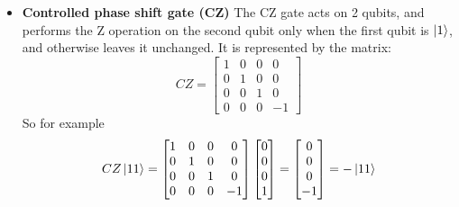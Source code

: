 \documentclass[main.tex]{subfiles}
\theoremstyle{definition}
\begin{document}
\begin{itemize}
	\item \textbf{Controlled phase shift gate (CZ)} The CZ gate acts on 2 qubits, 
	and performs the Z operation on the second qubit only when the first qubit is $\ket{1}$, and 
	otherwise leaves it unchanged. It is represented by the matrix:
	\begin{equation}
	CZ=
	\begin{bmatrix}
	1 & 0 & 0 & 0\\
	0 & 1 & 0 & 0\\
	0 & 0 & 1 & 0\\
	0 & 0 & 0 & -1
	\end{bmatrix}
	\end{equation}
	So for example
	$$
	CZ\ket{11}=
	\begin{bmatrix}
	1 & 0 & 0 & 0\\
	0 & 1 & 0 & 0\\
	0 & 0 & 1 & 0\\
	0 & 0 & 0 & -1
	\end{bmatrix}
	\begin{bmatrix}
	0 \\
	0 \\
	0 \\
	1
	\end{bmatrix}
	= 
	\begin{bmatrix}
	0 \\
	0 \\
	0 \\
	-1
	\end{bmatrix}
	=
	-\ket{11}
	$$\\
	

\end{itemize}
\end{document}
